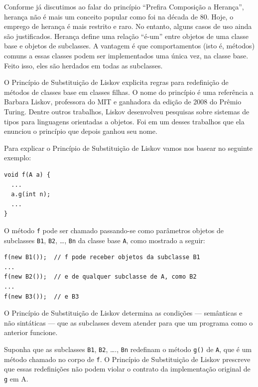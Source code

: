 \documentclass[
  11pt,
  twoside]{book}
\newcommand{\passthrough}[1]{#1}
\begin{document}
Conforme já discutimos ao falar do princípio ``Prefira Composição a
Herança'', herança não é mais um conceito popular como foi na década de
80. Hoje, o emprego de herança é mais restrito e raro. No entanto,
alguns casos de uso ainda são justificados. Herança define uma relação
``é-um'' entre objetos de uma classe base e objetos de subclasses. A
vantagem é que comportamentos (isto é, métodos) comuns a essas classes
podem ser implementados uma única vez, na classe base. Feito isso, eles
são herdados em todas as subclasses.

 O Princípio de Substituição de Liskov explicita
regras para redefinição de métodos de classes base em classes filhas. O
nome do princípio é uma referência a Barbara Liskov, professora do MIT e
ganhadora da edição de 2008 do Prêmio Turing. Dentre outros trabalhos,
Liskov desenvolveu pesquisas sobre sistemas de tipos para linguagens
orientadas a objetos. Foi em um desses trabalhos que ela enunciou o
princípio que depois ganhou seu nome.

Para explicar o Princípio de Substituição de Liskov vamos nos basear no
seguinte exemplo:

\begin{lstlisting}
void f(A a) {
  ...
  a.g(int n);
  ...
}
\end{lstlisting}

O método \passthrough{\lstinline!f!} pode ser chamado passando-se como
parâmetros objetos de subclasses \passthrough{\lstinline!B1!},
\passthrough{\lstinline!B2!}, \ldots, \passthrough{\lstinline!Bn!} da
classe base \passthrough{\lstinline!A!}, como mostrado a seguir:

\begin{lstlisting}
f(new B1());  // f pode receber objetos da subclasse B1 
...
f(new B2());  // e de qualquer subclasse de A, como B2
...
f(new B3());  // e B3
\end{lstlisting}

O Princípio de Substituição de Liskov determina as condições ---
semânticas e não sintáticas --- que as subclasses devem atender para que
um programa como o anterior funcione.

Suponha que as subclasses \passthrough{\lstinline!B1!},
\passthrough{\lstinline!B2!}, \ldots., \passthrough{\lstinline!Bn!}
redefinam o método \passthrough{\lstinline!g()!} de
\passthrough{\lstinline!A!}, que é um método chamado no corpo de
\passthrough{\lstinline!f!}. O Princípio de Substituição de Liskov
prescreve que essas redefinições não podem violar o contrato da
implementação original de \passthrough{\lstinline!g!} em A.
\end{document}
